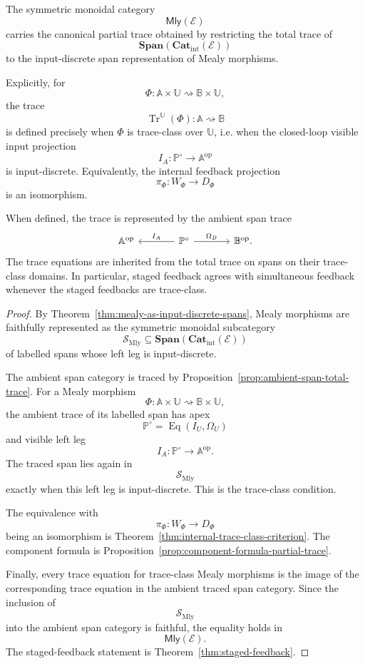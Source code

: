 \begin{theorem}
\label{thm:mly-partially-traced}
The symmetric monoidal category
\[
\mathsf{Mly}(\mathcal E)
\]
carries the canonical partial trace obtained by restricting the total trace of
\[
\mathbf{Span}(\mathbf{Cat}_{\mathrm{int}}(\mathcal E))
\]
to the input-discrete span representation of Mealy morphisms.

Explicitly, for
\[
\Phi:
\mathbb A\times\mathbb U
\rightsquigarrow
\mathbb B\times\mathbb U,
\]
the trace
\[
\operatorname{Tr}^{\mathbb U}(\Phi):
\mathbb A\rightsquigarrow\mathbb B
\]
is defined precisely when \(\Phi\) is trace-class over \(\mathbb U\), i.e.
when the closed-loop visible input projection
\[
I_A:\mathbb P^\circ\to\mathbb A^{\mathrm{op}}
\]
is input-discrete.  Equivalently, the internal feedback projection
\[
\pi_\Phi:W_\Phi\to D_\Phi
\]
is an isomorphism.

When defined, the trace is represented by the ambient span trace
\[
\begin{tikzcd}[column sep=large]
\mathbb A^{\mathrm{op}}
&
\mathbb P^\circ
  \arrow[l, "I_A"']
  \arrow[r, "\Omega_B"]
&
\mathbb B^{\mathrm{op}} .
\end{tikzcd}
\]
The trace equations are inherited from the total trace on spans on their
trace-class domains.  In particular, staged feedback agrees with simultaneous
feedback whenever the staged feedbacks are trace-class.
\end{theorem}

\begin{proof}
By Theorem~\ref{thm:mealy-as-input-discrete-spans}, Mealy morphisms are
faithfully represented as the symmetric monoidal subcategory
\[
\mathcal S_{\mathrm{Mly}}
\subseteq
\mathbf{Span}(\mathbf{Cat}_{\mathrm{int}}(\mathcal E))
\]
of labelled spans whose left leg is input-discrete.

The ambient span category is traced by
Proposition~\ref{prop:ambient-span-total-trace}.  For a Mealy morphism
\[
\Phi:
\mathbb A\times\mathbb U
\rightsquigarrow
\mathbb B\times\mathbb U,
\]
the ambient trace of its labelled span has apex
\[
\mathbb P^\circ=\operatorname{Eq}(I_U,\Omega_U)
\]
and visible left leg
\[
I_A:\mathbb P^\circ\to\mathbb A^{\mathrm{op}}.
\]
The traced span lies again in
\[
\mathcal S_{\mathrm{Mly}}
\]
exactly when this left leg is input-discrete.  This is the trace-class
condition.

The equivalence with
\[
\pi_\Phi:W_\Phi\to D_\Phi
\]
being an isomorphism is Theorem~\ref{thm:internal-trace-class-criterion}.
The component formula is Proposition~\ref{prop:component-formula-partial-trace}.

Finally, every trace equation for trace-class Mealy morphisms is the image of
the corresponding trace equation in the ambient traced span category.  Since
the inclusion of
\[
\mathcal S_{\mathrm{Mly}}
\]
into the ambient span category is faithful, the equality holds in
\[
\mathsf{Mly}(\mathcal E).
\]
The staged-feedback statement is Theorem~\ref{thm:staged-feedback}.
\end{proof}

